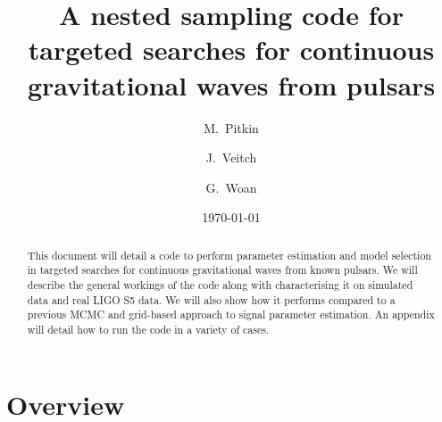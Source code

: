 \documentclass[aps,prd,showpacs,superscriptaddress,twocolumn,preprintnumbers,altaffilletter]{revtex4-1}
\newcommand{\gws}{gravitational waves\xspace}
\begin{document}
\title{A nested sampling code for targeted searches for continuous \gws from pulsars}

\author{M.~Pitkin}
\author{J.~Veitch}
\author{G.~Woan}


\date{\today}

\begin{abstract}
This document will detail a code to perform parameter estimation and model selection in targeted searches for
continuous \gws from known pulsars. We will describe the general workings of the code along with characterising
it on simulated data and real LIGO S5 data. We will also show how it performs compared to a previous MCMC and
grid-based approach to signal parameter estimation. An appendix will detail how to run the code in a variety
of cases.
\end{abstract}

\preprint{}

\maketitle

\section{Overview}
\end{document}
